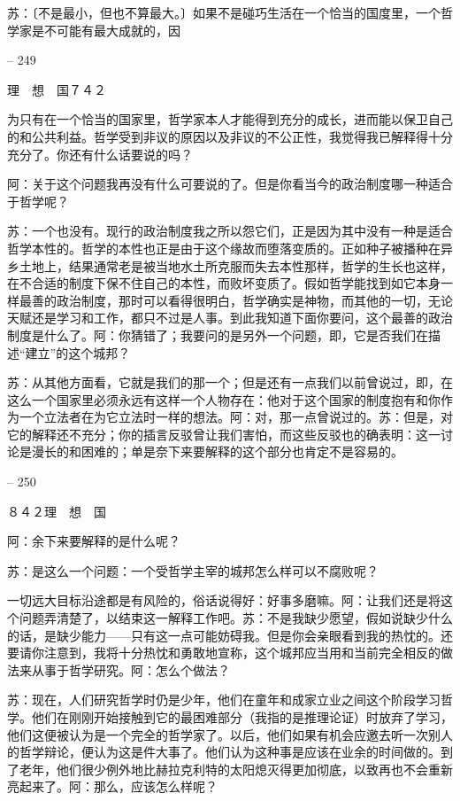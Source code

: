 \documentclass[11pt,oneside]{book}
\begin{document}
\begin{common-format}
    苏：〔不是最小，但也不算最大。〕如果不是碰巧生活在一个恰当的国度里，一个哲学家是不可能有最大成就的，因

    

-- 249

    理　想　国７４２

    为只有在一个恰当的国家里，哲学家本人才能得到充分的成长，进而能以保卫自己的和公共利益。哲学受到非议的原因以及非议的不公正性，我觉得我已解释得十分充分了。你还有什么话要说的吗？

    阿：关于这个问题我再没有什么可要说的了。但是你看当今的政治制度哪一种适合于哲学呢？

    苏：一个也没有。现行的政治制度我之所以怨它们，正是因为其中没有一种是适合哲学本性的。哲学的本性也正是由于这个缘故而堕落变质的。正如种子被播种在异乡土地上，结果通常老是被当地水土所克服而失去本性那样，哲学的生长也这样，在不合适的制度下保不住自己的本性，而败坏变质了。假如哲学能找到如它本身一样最善的政治制度，那时可以看得很明白，哲学确实是神物，而其他的一切，无论天赋还是学习和工作，都只不过是人事。到此我知道下面你要问，这个最善的政治制度是什么了。阿：你猜错了；我要问的是另外一个问题，即，它是否我们在描述“建立”的这个城邦？

    苏：从其他方面看，它就是我们的那一个；但是还有一点我们以前曾说过，即，在这么一个国家里必须永远有这样一个人物存在：他对于这个国家的制度抱有和你作为一个立法者在为它立法时一样的想法。阿：对，那一点曾说过的。苏：但是，对它的解释还不充分；你的插言反驳曾让我们害怕，而这些反驳也的确表明：这一讨论是漫长的和困难的；单是奈下来要解释的这个部分也肯定不是容易的。

    

-- 250

    ８４２理　想　国

    阿：余下来要解释的是什么呢？

    苏：是这么一个问题：一个受哲学主宰的城邦怎么样可以不腐败呢？

    一切远大目标沿途都是有风险的，俗话说得好：好事多磨嘛。阿：让我们还是将这个问题弄清楚了，以结束这一解释工作吧。苏：不是我缺少愿望，假如说缺少什么的话，是缺少能力——只有这一点可能妨碍我。但是你会亲眼看到我的热忱的。还要请你注意到，我将十分热忱和勇敢地宣称，这个城邦应当用和当前完全相反的做法来从事于哲学研究。阿：怎么个做法？

    苏：现在，人们研究哲学时仍是少年，他们在童年和成家立业之间这个阶段学习哲学。他们在刚刚开始接触到它的最困难部分（我指的是推理论证）时放弃了学习，他们这便被认为是一个完全的哲学家了。以后，他们如果有机会应邀去听一次别人的哲学辩论，便认为这是件大事了。他们认为这种事是应该在业余的时间做的。到了老年，他们很少例外地比赫拉克利特的太阳熄灭得更加彻底，以致再也不会重新亮起来了。阿：那么，应该怎么样呢？


\end{common-format}
\end{document}
